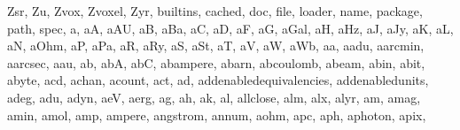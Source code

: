 \documentclass[letterpaper,10pt,english]{sphinxmanual}
\begin{document}
\begin{sphinxVerbatim}[commandchars=\\\{\}]
 \PYGZsq{}Zsr\PYGZsq{},
 \PYGZsq{}Zu\PYGZsq{},
 \PYGZsq{}Zvox\PYGZsq{},
 \PYGZsq{}Zvoxel\PYGZsq{},
 \PYGZsq{}Zyr\PYGZsq{},
 \PYGZsq{}\PYGZus{}\PYGZus{}builtins\PYGZus{}\PYGZus{}\PYGZsq{},
 \PYGZsq{}\PYGZus{}\PYGZus{}cached\PYGZus{}\PYGZus{}\PYGZsq{},
 \PYGZsq{}\PYGZus{}\PYGZus{}doc\PYGZus{}\PYGZus{}\PYGZsq{},
 \PYGZsq{}\PYGZus{}\PYGZus{}file\PYGZus{}\PYGZus{}\PYGZsq{},
 \PYGZsq{}\PYGZus{}\PYGZus{}loader\PYGZus{}\PYGZus{}\PYGZsq{},
 \PYGZsq{}\PYGZus{}\PYGZus{}name\PYGZus{}\PYGZus{}\PYGZsq{},
 \PYGZsq{}\PYGZus{}\PYGZus{}package\PYGZus{}\PYGZus{}\PYGZsq{},
 \PYGZsq{}\PYGZus{}\PYGZus{}path\PYGZus{}\PYGZus{}\PYGZsq{},
 \PYGZsq{}\PYGZus{}\PYGZus{}spec\PYGZus{}\PYGZus{}\PYGZsq{},
 \PYGZsq{}a\PYGZsq{},
 \PYGZsq{}aA\PYGZsq{},
 \PYGZsq{}aAU\PYGZsq{},
 \PYGZsq{}aB\PYGZsq{},
 \PYGZsq{}aBa\PYGZsq{},
 \PYGZsq{}aC\PYGZsq{},
 \PYGZsq{}aD\PYGZsq{},
 \PYGZsq{}aF\PYGZsq{},
 \PYGZsq{}aG\PYGZsq{},
 \PYGZsq{}aGal\PYGZsq{},
 \PYGZsq{}aH\PYGZsq{},
 \PYGZsq{}aHz\PYGZsq{},
 \PYGZsq{}aJ\PYGZsq{},
 \PYGZsq{}aJy\PYGZsq{},
 \PYGZsq{}aK\PYGZsq{},
 \PYGZsq{}aL\PYGZsq{},
 \PYGZsq{}aN\PYGZsq{},
 \PYGZsq{}aOhm\PYGZsq{},
 \PYGZsq{}aP\PYGZsq{},
 \PYGZsq{}aPa\PYGZsq{},
 \PYGZsq{}aR\PYGZsq{},
 \PYGZsq{}aRy\PYGZsq{},
 \PYGZsq{}aS\PYGZsq{},
 \PYGZsq{}aSt\PYGZsq{},
 \PYGZsq{}aT\PYGZsq{},
 \PYGZsq{}aV\PYGZsq{},
 \PYGZsq{}aW\PYGZsq{},
 \PYGZsq{}aWb\PYGZsq{},
 \PYGZsq{}aa\PYGZsq{},
 \PYGZsq{}aadu\PYGZsq{},
 \PYGZsq{}aarcmin\PYGZsq{},
 \PYGZsq{}aarcsec\PYGZsq{},
 \PYGZsq{}aau\PYGZsq{},
 \PYGZsq{}ab\PYGZsq{},
 \PYGZsq{}abA\PYGZsq{},
 \PYGZsq{}abC\PYGZsq{},
 \PYGZsq{}abampere\PYGZsq{},
 \PYGZsq{}abarn\PYGZsq{},
 \PYGZsq{}abcoulomb\PYGZsq{},
 \PYGZsq{}abeam\PYGZsq{},
 \PYGZsq{}abin\PYGZsq{},
 \PYGZsq{}abit\PYGZsq{},
 \PYGZsq{}abyte\PYGZsq{},
 \PYGZsq{}acd\PYGZsq{},
 \PYGZsq{}achan\PYGZsq{},
 \PYGZsq{}acount\PYGZsq{},
 \PYGZsq{}act\PYGZsq{},
 \PYGZsq{}ad\PYGZsq{},
 \PYGZsq{}add\PYGZus{}enabled\PYGZus{}equivalencies\PYGZsq{},
 \PYGZsq{}add\PYGZus{}enabled\PYGZus{}units\PYGZsq{},
 \PYGZsq{}adeg\PYGZsq{},
 \PYGZsq{}adu\PYGZsq{},
 \PYGZsq{}adyn\PYGZsq{},
 \PYGZsq{}aeV\PYGZsq{},
 \PYGZsq{}aerg\PYGZsq{},
 \PYGZsq{}ag\PYGZsq{},
 \PYGZsq{}ah\PYGZsq{},
 \PYGZsq{}ak\PYGZsq{},
 \PYGZsq{}al\PYGZsq{},
 \PYGZsq{}allclose\PYGZsq{},
 \PYGZsq{}alm\PYGZsq{},
 \PYGZsq{}alx\PYGZsq{},
 \PYGZsq{}alyr\PYGZsq{},
 \PYGZsq{}am\PYGZsq{},
 \PYGZsq{}amag\PYGZsq{},
 \PYGZsq{}amin\PYGZsq{},
 \PYGZsq{}amol\PYGZsq{},
 \PYGZsq{}amp\PYGZsq{},
 \PYGZsq{}ampere\PYGZsq{},
 \PYGZsq{}angstrom\PYGZsq{},
 \PYGZsq{}annum\PYGZsq{},
 \PYGZsq{}aohm\PYGZsq{},
 \PYGZsq{}apc\PYGZsq{},
 \PYGZsq{}aph\PYGZsq{},
 \PYGZsq{}aphoton\PYGZsq{},
 \PYGZsq{}apix\PYGZsq{},

\end{sphinxVerbatim}
\end{document}
